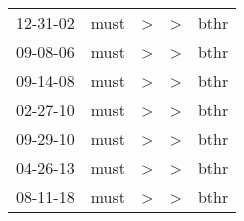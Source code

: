 \begin{supertabular}{lllll}
 12-31-02 &  must &  \textgreater &  \textgreater &  bthr \\
 09-08-06 &  must &  \textgreater &  \textgreater &  bthr \\
 09-14-08 &  must &  \textgreater &  \textgreater &  bthr \\
 02-27-10 &  must &  \textgreater &  \textgreater &  bthr \\
 09-29-10 &  must &  \textgreater &  \textgreater &  bthr \\
 04-26-13 &  must &  \textgreater &  \textgreater &  bthr \\
 08-11-18 &  must &  \textgreater &  \textgreater &  bthr \\
\end{supertabular}

